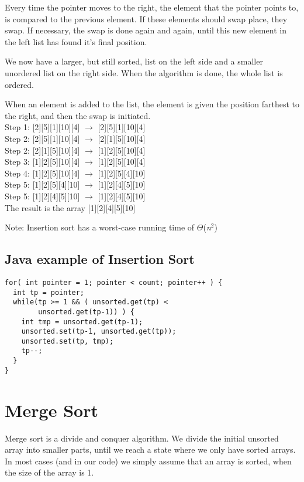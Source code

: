 \documentclass[12pt,a4paper]{article}
\begin{document}
Every time the pointer moves to the right, the element that the pointer points to, is compared to the previous element. If these elements should swap place, they swap. If necessary, the swap is done again and again, until this new element in the left list has found it's final position. 

We now have a larger, but still sorted, list on the left side and a smaller unordered list on the right side. When the algorithm is done, the whole list is ordered.

When an element is added to the list, the element is given the position farthest to the right, and then the swap is initiated.\\

\noindent
Step 1: {\color{blue}[2][5]}[1][10][4] $\rightarrow$ {\color{blue}[2][5]}[1][10][4]\\
\noindent
Step 2: [2]{\color{blue}[5][1]}[10][4] $\rightarrow$ [2]{\color{blue}[1][5]}[10][4]\\
\noindent
Step 2: {\color{blue}[2][1]}[5][10][4] $\rightarrow$ {\color{blue}[1][2]}[5][10][4]\\
\noindent
Step 3: [1][2]{\color{blue}[5][10]}[4] $\rightarrow$ [1][2]{\color{blue}[5][10]}[4]\\
\noindent
Step 4: [1][2][5]{\color{blue}[10][4]} $\rightarrow$ [1][2][5]{\color{blue}[4][10]}\\
\noindent
Step 5: [1][2]{\color{blue}[5][4]}[10] $\rightarrow$ [1][2]{\color{blue}[4][5]}[10]\\
\noindent
Step 5: [1]{\color{blue}[2][4]}[5][10] $\rightarrow$ [1]{\color{blue}[2][4]}[5][10]\\

\noindent
The result is the array [1][2][4][5][10]

\noindent
Note: Insertion sort has a worst-case running time of $\Theta$(\textit{n$^{2}$})

\subsection{Java example of Insertion Sort}
\begin{lstlisting}
for( int pointer = 1; pointer < count; pointer++ ) {
  int tp = pointer;
  while(tp >= 1 && ( unsorted.get(tp) < 
        unsorted.get(tp-1)) ) {
    int tmp = unsorted.get(tp-1);
    unsorted.set(tp-1, unsorted.get(tp));
    unsorted.set(tp, tmp);
    tp--;
  }
}
\end{lstlisting}
\clearpage

\section{Merge Sort}
Merge sort is a divide and conquer algorithm. We divide the initial unsorted array into smaller parts, until we reach a state where we only have sorted arrays. In most cases (and in our code) we simply assume that an array is sorted, when the size of the array is 1.
\end{document}

